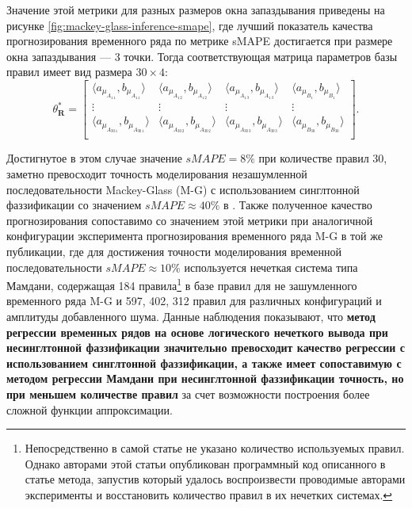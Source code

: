 Значение этой метрики для разных размеров окна запаздывания приведены на рисунке \cref{fig:mackey-glass-inference-smape}, где лучший показатель качества прогнозирования временного ряда по метрике sMAPE достигается при размере окна запаздывания --- 3 точки. Тогда соответствующая матрица параметров базы правил имеет вид размера $30\times 4$:
\begin{equation*}
	\theta^*_{\mathbf{R}} = \begin{bmatrix}
		\langle a_{\mu_{A_{1\,1}}}, b_{\mu_{A_{1\,1}}}\rangle & \langle a_{\mu_{A_{1\,2}}}, b_{\mu_{A_{1\,2}}}\rangle & \langle a_{\mu_{A_{1\,3}}}, b_{\mu_{A_{1\,3}}}\rangle & \langle a_{\mu_{B_{1}}}, b_{\mu_{B_{1}}}\rangle \\
		\vdots & \vdots & \vdots & \vdots \\
		\langle a_{\mu_{A_{30\,1}}}, b_{\mu_{A_{30\,1}}}\rangle & \langle a_{\mu_{A_{30\,2}}}, b_{\mu_{A_{30\,2}}}\rangle & \langle a_{\mu_{A_{30\,3}}}, b_{\mu_{A_{30\,3}}}\rangle & \langle a_{\mu_{B_{30}}}, b_{\mu_{B_{30}}}\rangle \\
	\end{bmatrix}.
\end{equation*}

Достигнутое в этом случае значение $sMAPE = 8\%$ при количестве правил 30, заметно превосходит точность моделирования незашумленной последовательности Mackey-Glass (M-G) с использованием синглтонной фаззификации со значением $sMAPE \approx 40\%$ в \cite{Pekaslan2020}. Также полученное качество прогнозирования сопоставимо со значением этой метрики при аналогичной конфигурации эксперимента прогнозирования временного ряда M-G в той же публикации, где для достижения точности моделирования временной последовательности $sMAPE \approx 10\%$ используется нечеткая система типа Мамдани, содержащая 184 правила\footnote{Непосредственно в самой статье не указано количество используемых правил. Однако авторами этой статьи опубликован программный код описанного в статье метода, запустив который удалось воспроизвести проводимые авторами эксперименты и восстановить количество правил в их нечетких системах.} в базе правил для не зашумленного временного ряда M-G и 597, 402, 312 правил для различных конфигураций и амплитуды добавленного шума. Данные наблюдения показывают, что \textbf{метод регрессии временных рядов на основе логического нечеткого вывода при несинглтонной фаззификации значительно превосходит качество регрессии с использованием синглтонной фаззификации, а также имеет сопоставимую с методом регрессии Мамдани при несинглтонной фаззификации точность, но при меньшем количестве правил} за счет возможности построения более сложной функции аппроксимации.


